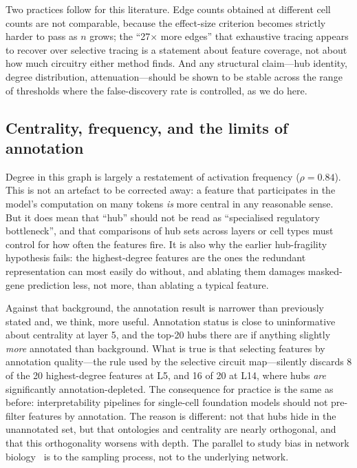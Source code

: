 \documentclass[11pt,onecolumn]{article}
\begin{document}
Two practices follow for this literature. Edge counts obtained at different cell counts are not comparable, because the effect-size criterion becomes strictly harder to pass as $n$ grows; the ``27$\times$ more edges'' that exhaustive tracing appears to recover over selective tracing is a statement about feature coverage, not about how much circuitry either method finds. And any structural claim---hub identity, degree distribution, attenuation---should be shown to be stable across the range of thresholds where the false-discovery rate is controlled, as we do here.

\subsection{Centrality, frequency, and the limits of annotation}

Degree in this graph is largely a restatement of activation frequency ($\rho=0.84$). This is not an artefact to be corrected away: a feature that participates in the model's computation on many tokens \emph{is} more central in any reasonable sense. But it does mean that ``hub'' should not be read as ``specialised regulatory bottleneck'', and that comparisons of hub sets across layers or cell types must control for how often the features fire. It is also why the earlier hub-fragility hypothesis fails: the highest-degree features are the ones the redundant representation can most easily do without, and ablating them damages masked-gene prediction less, not more, than ablating a typical feature.

Against that background, the annotation result is narrower than previously stated and, we think, more useful. Annotation status is close to uninformative about centrality at layer 5, and the top-20 hubs there are if anything slightly \emph{more} annotated than background. What is true is that selecting features by annotation quality---the rule used by the selective circuit map---silently discards 8 of the 20 highest-degree features at L5, and 16 of 20 at L14, where hubs \emph{are} significantly annotation-depleted. The consequence for practice is the same as before: interpretability pipelines for single-cell foundation models should not pre-filter features by annotation. The reason is different: not that hubs hide in the unannotated set, but that ontologies and centrality are nearly orthogonal, and that this orthogonality worsens with depth. The parallel to study bias in network biology~\citep{szklarczyk2023string,gillis2014bias} is to the sampling process, not to the underlying network.
\end{document}
